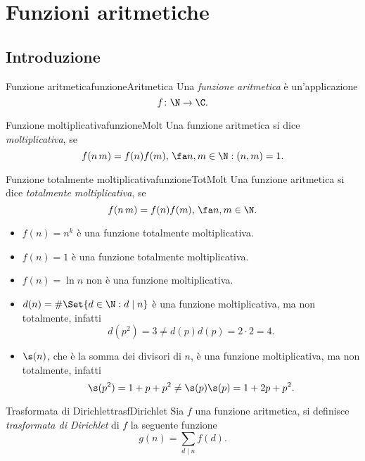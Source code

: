 %
%
\chapter{Funzioni aritmetiche}
\section{Introduzione}

\begin{defn}{Funzione aritmetica}{funzioneAritmetica}
	Una \emph{funzione aritmetica} è un'applicazione
	\[
		f\colon \N\to\C.
	\]
\end{defn}

\begin{defn}{Funzione moltiplicativa}{funzioneMolt}
	Una funzione aritmetica si dice \emph{moltiplicativa}, se
	\[
		f(n\,m)=f(n)f(m),\,\fa n,m\in\N:(n,m)=1.
	\]
\end{defn}

\begin{defn}{Funzione totalmente moltiplicativa}{funzioneTotMolt}
	Una funzione aritmetica si dice \emph{totalmente moltiplicativa}, se
	\[
		f(n\,m)=f(n)f(m),\,\fa n,m\in\N.
	\]
\end{defn}

\begin{ese}
	\begin{itemize}
		\item \(f(n)=n^k\) è una funzione totalmente moltiplicativa.
		\item \(f(n)=1\) è una funzione totalmente moltiplicativa.
		\item \(f(n)=\ln n\) non è una funzione moltiplicativa.
		\item \(d(n)=\#\Set{d\in\N:d\mid n}\) è una funzione moltiplicativa, ma non totalmente, infatti
		      \[
			      d(p^2)=3\neq d(p)d(p)=2\cdot 2=4.
		      \]
		\item \(\s(n)\), che è la somma dei divisori di \(n\), è una funzione moltiplicativa, ma non totalmente, infatti
		      \[
			      \s(p^2)=1+p+p^2\neq\s(p)\s(p)=1+2p+p^2.
		      \]
	\end{itemize}
\end{ese}

\begin{defn}{Trasformata di Dirichlet}{trasfDirichlet}
	Sia \(f\) una funzione aritmetica, si definisce \emph{trasformata di Dirichlet} di \(f\) la seguente funzione
	\[
		g(n)=\sum_{d\mid n}f(d).
	\]
\end{defn}

